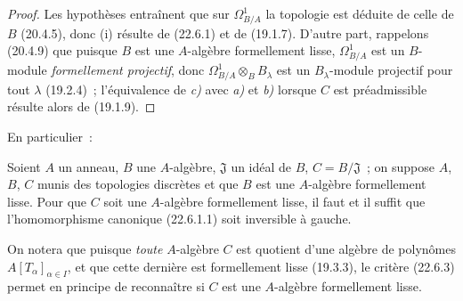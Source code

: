 \begin{proof}
Les hypothèses entraînent que sur $\Omega^1_{B/A}$ la topologie est déduite de
celle de $B$ (20.4.5), donc (i) résulte de (22.6.1) et de (19.1.7). D'autre
part, rappelons (20.4.9) que puisque $B$ est une $A$-algèbre formellement
lisse, $\Omega^1_{B/A}$ est un $B$-module \emph{formellement projectif}, donc
$\Omega^1_{B/A}\otimes_BB_\lambda$ est un $B_\lambda$-module projectif pour
tout $\lambda$ (19.2.4)~; l'équivalence de \emph{c)} avec \emph{a)} et \emph{b)} lorsque $C$ est
préadmissible résulte alors de (19.1.9).
\end{proof}

En particulier~:

\begin{corollary}[22.6.3]
\label{0.22.6.3-fr}
Soient $A$ un anneau, $B$ une $A$-algèbre, $\mathfrak J$ un idéal de $B$,
$C=B/\mathfrak J$~; on suppose $A$, $B$, $C$ munis des topologies discrètes
et que $B$ est une $A$-algèbre formellement lisse. Pour que $C$ soit une
$A$-algèbre formellement lisse, il faut et il suffit que l'homomorphisme
canonique \textup{(22.6.1.1)} soit inversible à gauche.
\end{corollary}

On notera que puisque \emph{toute} $A$-algèbre $C$ est quotient d'une algèbre de
polynômes $A[T_\alpha]_{\alpha\in I}$, et que cette dernière est formellement
lisse (19.3.3), le critère (22.6.3) permet en principe de reconnaître si $C$
est une $A$-algèbre formellement lisse.

